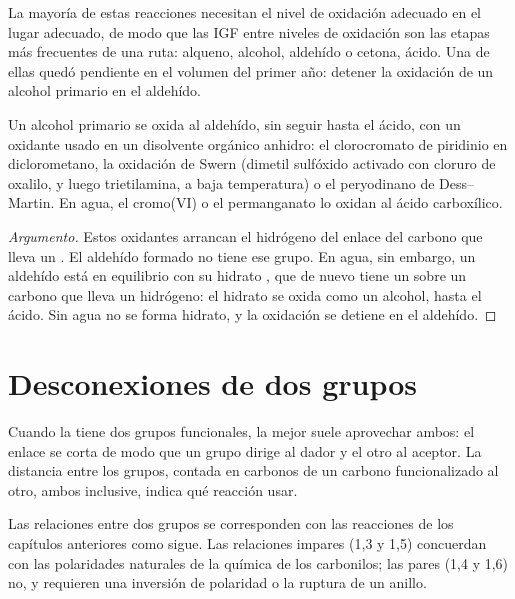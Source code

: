 La mayoría de estas reacciones necesitan el nivel de oxidación adecuado en el lugar adecuado, de modo que las IGF entre niveles
de oxidación son las etapas más frecuentes de una ruta: alqueno, alcohol, aldehído o cetona, ácido. Una de ellas quedó
pendiente en el volumen del primer año: detener la oxidación de un alcohol primario en el aldehído.

\begin{proposition}\label{prop:b2:retrosynthesis:mild-oxidation}
Un alcohol primario se oxida al aldehído, sin seguir hasta el ácido, con un oxidante usado en un
disolvente orgánico anhidro: el clorocromato de piridinio en diclorometano, la oxidación de Swern (dimetil
sulfóxido activado con cloruro de oxalilo, y luego trietilamina, a baja temperatura) o el peryodinano de
Dess--Martin. En agua, el cromo(VI) o el permanganato lo oxidan al ácido carboxílico.
\end{proposition}

\begin{proof}[Argumento]
Estos oxidantes arrancan el hidrógeno del enlace  del carbono que lleva un . El aldehído
formado no tiene ese grupo. En agua, sin embargo, un aldehído está en equilibrio con su hidrato
, que de nuevo tiene un  sobre un carbono que lleva un hidrógeno: el hidrato se oxida
como un alcohol, hasta el ácido. Sin agua no se forma hidrato, y la oxidación se detiene en el
aldehído.
\end{proof}

\section{Desconexiones de dos grupos}

Cuando la  tiene dos grupos funcionales, la mejor  suele aprovechar ambos: el enlace se corta
de modo que un grupo dirige al dador y el otro al aceptor. La distancia entre los grupos,
contada en carbonos de un carbono funcionalizado al otro, ambos inclusive, indica qué reacción usar.

\begin{proposition}\label{prop:b2:retrosynthesis:patterns}
Las relaciones entre dos grupos se corresponden con las reacciones de los capítulos anteriores como sigue. Las
relaciones impares (1,3 y 1,5) concuerdan con las polaridades naturales de la química de los carbonilos; las pares (1,4
y 1,6) no, y requieren una inversión de polaridad o la ruptura de un anillo.
\end{proposition}


